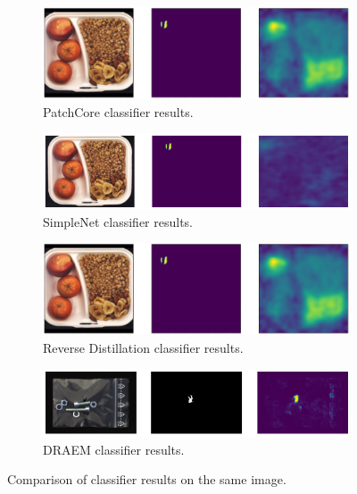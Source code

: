 \begin{figure}[H]
    \captionsetup[subfigure]{justification=centering}
    \centering
    \begin{subfigure}[b]{0.45\textwidth}
        \centering
        \includegraphics[width=\textwidth]{figures/sameimagecomparison/breakfast_box_test_structural_anomalies_059.png}
        \caption{PatchCore \cite{patchCore2022} classifier results.}

    \end{subfigure}
    \begin{subfigure}[b]{0.45\textwidth}
        \centering
        \includegraphics[width=\textwidth]{figures/sameimagecomparison/image_prediction_244.png}
        \caption{SimpleNet \cite{liu2023simplenet} classifier results.}

    \end{subfigure}
    \begin{subfigure}[b]{0.45\textwidth}
        \centering
        \includegraphics[width=\textwidth]{figures/sameimagecomparison/breakfast_box_test_structural_anomalies_059.png}
        \caption{Reverse Distillation \cite{revdist2023} classifier results.}

    \end{subfigure}
    \begin{subfigure}[b]{0.45\textwidth}
        \centering
        \includegraphics[width=\textwidth]{figures/locoallapproaches/DRAEM/DRAEM_SB.png}
        \caption{DRAEM \cite{Zavrtanik_2021DRAEM} classifier results.}

    \end{subfigure}
    
    \caption{Comparison of classifier results on the same image.}
    \label{fig:sameimagecomparison}
\end{figure}